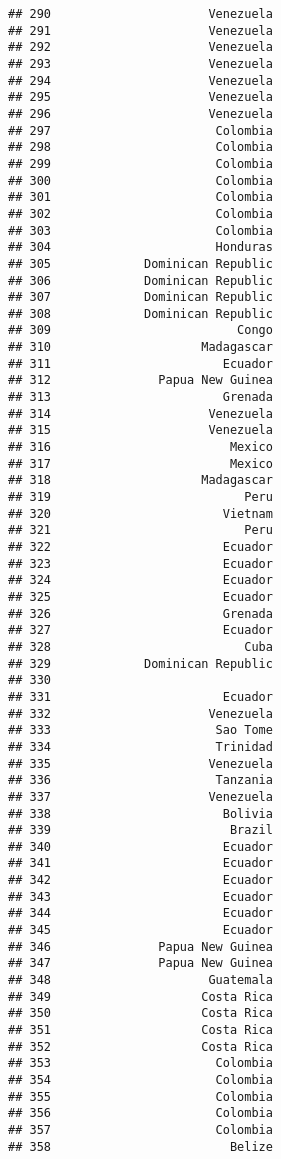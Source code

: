 \documentclass[
]{article}
\begin{document}
\begin{verbatim}
## 290                      Venezuela
## 291                      Venezuela
## 292                      Venezuela
## 293                      Venezuela
## 294                      Venezuela
## 295                      Venezuela
## 296                      Venezuela
## 297                       Colombia
## 298                       Colombia
## 299                       Colombia
## 300                       Colombia
## 301                       Colombia
## 302                       Colombia
## 303                       Colombia
## 304                       Honduras
## 305             Dominican Republic
## 306             Dominican Republic
## 307             Dominican Republic
## 308             Dominican Republic
## 309                          Congo
## 310                     Madagascar
## 311                        Ecuador
## 312               Papua New Guinea
## 313                        Grenada
## 314                      Venezuela
## 315                      Venezuela
## 316                         Mexico
## 317                         Mexico
## 318                     Madagascar
## 319                           Peru
## 320                        Vietnam
## 321                           Peru
## 322                        Ecuador
## 323                        Ecuador
## 324                        Ecuador
## 325                        Ecuador
## 326                        Grenada
## 327                        Ecuador
## 328                           Cuba
## 329             Dominican Republic
## 330                               
## 331                        Ecuador
## 332                      Venezuela
## 333                       Sao Tome
## 334                       Trinidad
## 335                      Venezuela
## 336                       Tanzania
## 337                      Venezuela
## 338                        Bolivia
## 339                         Brazil
## 340                        Ecuador
## 341                        Ecuador
## 342                        Ecuador
## 343                        Ecuador
## 344                        Ecuador
## 345                        Ecuador
## 346               Papua New Guinea
## 347               Papua New Guinea
## 348                      Guatemala
## 349                     Costa Rica
## 350                     Costa Rica
## 351                     Costa Rica
## 352                     Costa Rica
## 353                       Colombia
## 354                       Colombia
## 355                       Colombia
## 356                       Colombia
## 357                       Colombia
## 358                         Belize

\end{verbatim}
\end{document}
